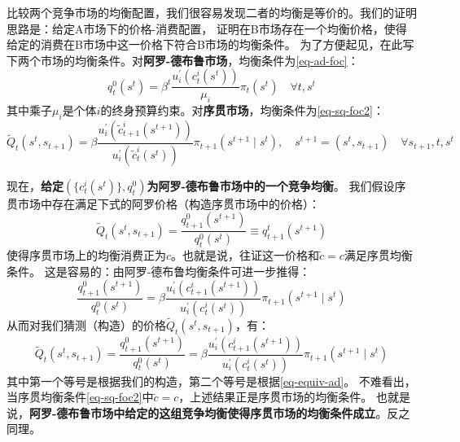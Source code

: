 比较两个竞争市场的均衡配置，我们很容易发现二者的均衡是等价的。我们的证明思路是：给定A市场下的价格-消费配置，
证明在B市场存在一个均衡价格，使得给定的消费在B市场中这一价格下符合B市场的均衡条件。
为了方便起见，在此写下两个市场的均衡条件。对\textbf{阿罗-德布鲁市场}，均衡条件为\ref{eq-ad-foc}：
\begin{equation*}
    q_t^0\left(s^t\right) = \beta^t \frac{u_i^{\prime}\left(c_t^i\left(s^t\right)\right)}{\mu_i} \pi_t\left(s^t\right)
    \quad \forall t, s^t
\end{equation*}
其中乘子$\mu_i$是个体$i$的终身预算约束。对\textbf{序贯市场}，均衡条件为\ref{eq-sq-foc2}：
\begin{equation*}
    \tilde{Q}_t\left(s^t, s_{t+1}\right) = \beta \frac{u_i^{\prime}\left(\tilde{c}_{t+1}^i\left(s^{t+1}\right)\right)}
        {u_i^{\prime}\left(\tilde{c}_t^i\left(s^t\right)\right)} 
            \pi_{t+1}\left(s^{t+1} \mid s^t\right), \quad s^{t+1}=(s^t,s_{t+1}) \quad \forall s_{t+1}, t, s^t
\end{equation*}

现在，\textbf{给定$\left(\{c_t^i\left(s^t\right)\},q_t^0\right)$为阿罗-德布鲁市场中的一个竞争均衡}。
我们假设序贯市场中存在满足下式的阿罗价格（构造序贯市场中的价格）：
\begin{equation}    \label{eq-price-ad-sq}
    \tilde{Q}_t\left(s^t,s_{t+1}\right) = \frac{q_{t+1}^0\left(s^{t+1}\right)}{q_t^0\left(s^t\right)}
        \equiv q_{t+1}^t\left(s^{t+1}\right)
\end{equation}
使得序贯市场上的均衡消费正为$c$。也就是说，往证这一价格和$\tilde{c}=c$满足序贯均衡条件。
这是容易的：由阿罗-德布鲁均衡条件可进一步推得：
\begin{equation}    \label{eq-equiv-ad}
    \frac{q_{t+1}^0\left(s^{t+1}\right)}{q_t^0\left(s^t\right)}= \beta\frac{ u_i^{\prime}\left(c_{t+1}^i\left(s^{t+1}\right)\right)}
        {u_i^{\prime}\left(c_t^i\left(s^t\right)\right)}\pi_{t+1}\left(s^{t+1} \mid s^t\right)
\end{equation}
从而对我们猜测（构造）的价格$\tilde{Q}_t\left(s^t, s_{t+1}\right)$，有：
\begin{equation}
    \tilde{Q}_t\left(s^t, s_{t+1}\right) = \frac{q_{t+1}^0\left(s^{t+1}\right)}{q_t^0\left(s^t\right)}
        = \beta\frac{ u_i^{\prime}\left(c_{t+1}^i\left(s^{t+1}\right)\right)}
        {u_i^{\prime}\left(c_t^i\left(s^t\right)\right)}\pi_{t+1}\left(s^{t+1} \mid s^t\right)
\end{equation}
其中第一个等号是根据我们的构造，第二个等号是根据\ref{eq-equiv-ad}。
不难看出，当序贯均衡条件\ref{eq-sq-foc2}中$\tilde{c}=c$，上述结果正是序贯市场的均衡条件。
也就是说，\textbf{阿罗-德布鲁市场中给定的这组竞争均衡使得序贯市场的均衡条件成立}。反之同理。

